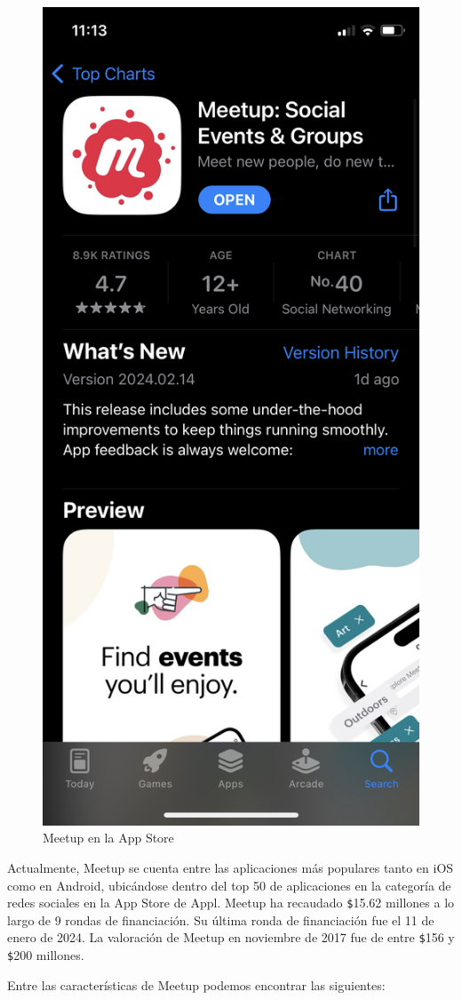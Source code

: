 \begin{figure}[H]
  \centering
  \includegraphics[cframe=black 2pt,width=0.3\linewidth]{images/estadodelarte/meetupappstore.jpeg}
  \caption{Meetup en la App Store}
  \label{fig:meetup_appstore}
\end{figure}
Actualmente, Meetup se cuenta entre las aplicaciones más populares tanto en iOS como en Android, 
ubicándose dentro del top 50 de aplicaciones en la categoría de redes sociales en la App Store de Appl\cite{REF12}. Meetup ha recaudado \verb|$|15.62 millones a lo largo de 9 rondas de financiación. 
Su última ronda de financiación fue el 11 de enero de 2024. La valoración de Meetup en noviembre de 2017 fue de entre \verb|$|156 y \verb|$|200 millones.\cite{REF11}

Entre las características de Meetup podemos encontrar las siguientes:

